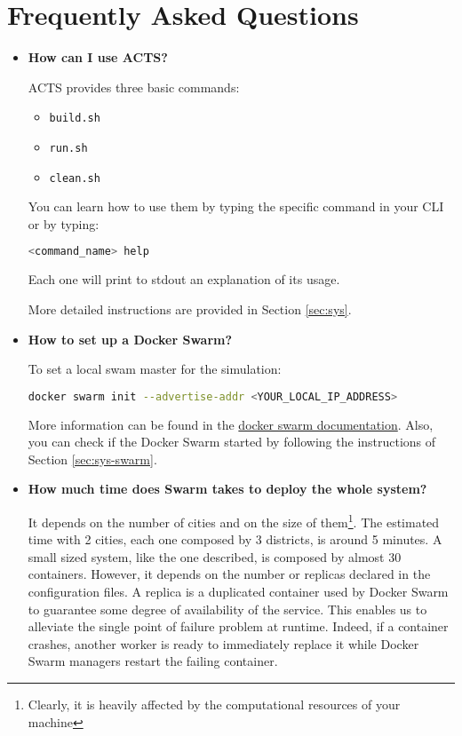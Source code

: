 \section{Frequently Asked Questions}\label{sec:faq}

\begin{itemize}

\item \textbf{How can I use ACTS?}

ACTS provides three basic commands:
\begin{itemize}
	\item \texttt{build.sh}
	\item \texttt{run.sh}
	\item \texttt{clean.sh}
\end{itemize}
You can learn how to use them by typing the specific command in your CLI or
by typing:
\begin{lstlisting}[language=bash]
<command_name> help
\end{lstlisting}
Each one will print to stdout an explanation of its usage.

More detailed instructions are provided in Section \ref{sec:sys}.

\item \textbf{How to set up a Docker Swarm?}

To set a local swam master for the simulation:

\begin{lstlisting}[language=bash]
docker swarm init --advertise-addr <YOUR_LOCAL_IP_ADDRESS>
\end{lstlisting}

More information can be found in the \href{https://docs.docker.com/engine/swarm/swarm-tutorial/create-swarm/}{docker swarm documentation}.
Also, you can check if the Docker Swarm started by following the instructions
of Section \ref{sec:sys-swarm}.

\item \textbf{How much time does Swarm takes to deploy the whole system?}

It depends on the number of cities and on the size of them\footnote{Clearly,
it is heavily affected by the computational resources of your machine}.
The estimated time with 2 cities, each one
composed by 3 districts, is around 5 minutes.
A small sized system, like
the one described, is composed by almost 30 containers.
However, it depends on the number or replicas declared in the configuration
files.
A replica is a duplicated container used by Docker Swarm to guarantee some
degree of availability of the service. This enables us to alleviate the single
point of failure problem at runtime. Indeed, if a container crashes, another
worker is ready to immediately replace it while Docker Swarm managers restart
the failing container.


\end{itemize}
